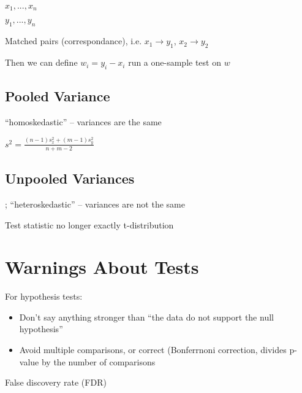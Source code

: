 \documentclass[twoside]{article}
\def\beginrefs{\begin{list}%
        {[\arabic{equation}]}{\usecounter{equation}
         \setlength{\leftmargin}{2.0truecm}\setlength{\labelsep}{0.4truecm}%
         \setlength{\labelwidth}{1.6truecm}}}
\def\endrefs{\end{list}}
\def\bibentry#1{\item[\hbox{[#1]}]}
\begin{document}
$x_1, ..., x_n$

$y_1, ... , y_n$

Matched pairs (correspondance), i.e. $x_1 \rightarrow y_1$, $x_2 \rightarrow y_2$

Then we can define $w_i = y_i - x_i$ run a one-sample test on $w$

\subsection{Pooled Variance}

``homoskedastic'' -- variances are the same

$s^2 = \frac{(n-1)s_x^2 + (m-1)s_y^2}{n+m-2}$

\subsection{Unpooled Variances}
;
``heteroskedastic'' -- variances are not the same

Test statistic no longer exactly t-distribution


\section{Warnings About Tests}

For hypothesis tests: 
\begin{itemize}
\item Don't say anything stronger than ``the data do not support the null hypothesis''
\item Avoid multiple comparisons, or correct (Bonferrnoni correction, divides p-value by the number of comparisons
\end{itemize}

False discovery rate (FDR)






\end{document}
